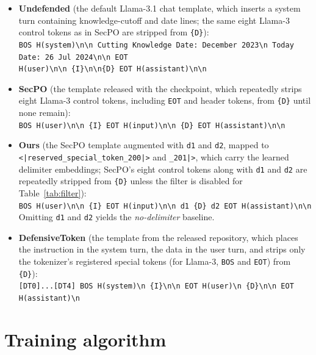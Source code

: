 \documentclass{article}
\begin{document}
\begin{itemize}\raggedright
  \item \textbf{Undefended} (the default Llama-3.1 chat template, which inserts a system turn containing knowledge-cutoff and date lines; the same eight Llama-3 control tokens as in SecPO are stripped from \texttt{\{D\}}):\\
  \texttt{BOS H(system)\textbackslash n\textbackslash n Cutting Knowledge Date: December 2023\textbackslash n Today Date: 26 Jul 2024\textbackslash n\textbackslash n EOT}\\
  \texttt{H(user)\textbackslash n\textbackslash n \{I\}\textbackslash n\textbackslash n\{D\} EOT H(assistant)\textbackslash n\textbackslash n}
  \item \textbf{SecPO} (the template released with the checkpoint, which repeatedly strips eight Llama-3 control tokens, including \texttt{EOT} and header tokens, from \texttt{\{D\}} until none remain):\\
  \texttt{BOS H(user)\textbackslash n\textbackslash n \{I\} EOT H(input)\textbackslash n\textbackslash n \{D\} EOT H(assistant)\textbackslash n\textbackslash n}
  \item \textbf{Ours} (the SecPO template augmented with \texttt{d1} and \texttt{d2}, mapped to \texttt{<|reserved\_special\_token\_200|>} and \texttt{\_201|>}, which carry the learned delimiter embeddings; SecPO's eight control tokens along with \texttt{d1} and \texttt{d2} are repeatedly stripped from \texttt{\{D\}} unless the filter is disabled for Table~\ref{tab:filter}):\\
  \texttt{BOS H(user)\textbackslash n\textbackslash n \{I\} EOT H(input)\textbackslash n\textbackslash n d1 \{D\} d2 EOT H(assistant)\textbackslash n\textbackslash n}\\
  Omitting \texttt{d1} and \texttt{d2} yields the \emph{no-delimiter} baseline.
  \item \textbf{DefensiveToken} (the template from the released repository, which places the instruction in the system turn, the data in the user turn, and strips only the tokenizer's registered special tokens (for Llama-3, \texttt{BOS} and \texttt{EOT}) from \texttt{\{D\}}):\\
  \texttt{[DT0]...[DT4] BOS H(system)\textbackslash n \{I\}\textbackslash n\textbackslash n EOT H(user)\textbackslash n \{D\}\textbackslash n\textbackslash n EOT H(assistant)\textbackslash n}
\end{itemize}

\section{Training algorithm}
\label{app:alg}
\end{document}
